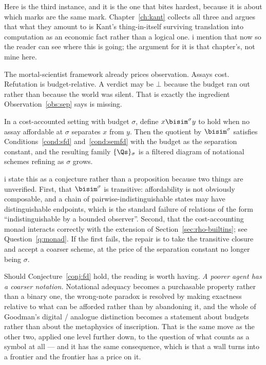 Here is the third instance, and it is the one that bites hardest,
because it is about which marks are the same mark.
Chapter~\ref{ch:kant} collects all three and argues that what they
amount to is Kant's thing-in-itself surviving translation into
computation as an economic fact rather than a logical one.
i mention that now so the reader can see where this is going; the
argument for it is that chapter's, not mine here.

The mortal-scientist framework already prices observation.
Assays cost.
Refutation is budget-relative.
A verdict may be $\bot$ because the budget ran out rather than
because the world was silent.
That is exactly the ingredient Observation~\ref{obs:sep} says is
missing.

\begin{conjecture}
\label{conj:fd}
In a cost-accounted setting with budget $\sigma$, define
$x \bisim^{\sigma} y$ to hold when no assay affordable at $\sigma$
separates $x$ from $y$.
Then the quotient by $\bisim^{\sigma}$ satisfies
Conditions~\ref{cond:sfd} and~\ref{cond:semfd} with the budget as
the separation constant, and the resulting family
$\{\Qs\}_{\sigma}$ is a filtered diagram of notational schemes
refining as $\sigma$ grows.
\end{conjecture}

\noindent
i state this as a conjecture rather than a proposition because two
things are unverified.
First, that $\bisim^{\sigma}$ is transitive: affordability is not
obviously composable, and a chain of pairwise-indistinguishable
states may have distinguishable endpoints, which is the standard
failure of relations of the form ``indistinguishable by a bounded
observer''.
Second, that the cost-accounting monad interacts correctly with the
extension of Section~\ref{sec:rho-builtins}; see
Question~\ref{q:monad}.
If the first fails, the repair is to take the transitive closure
and accept a coarser scheme, at the price of the separation
constant no longer being $\sigma$.

Should Conjecture~\ref{conj:fd} hold, the reading is worth having.
\emph{A poorer agent has a coarser notation.}
Notational adequacy becomes a purchasable property rather than a
binary one, the wrong-note paradox is resolved by making exactness
relative to what can be afforded rather than by abandoning it, and
the whole of Goodman's digital / analogue distinction becomes a
statement about budgets rather than about the metaphysics of
inscription.
That is the same move as the other two, applied one level further
down, to the question of what counts as a symbol at all --- and it
has the same consequence, which is that a wall turns into a
frontier and the frontier has a price on it.

